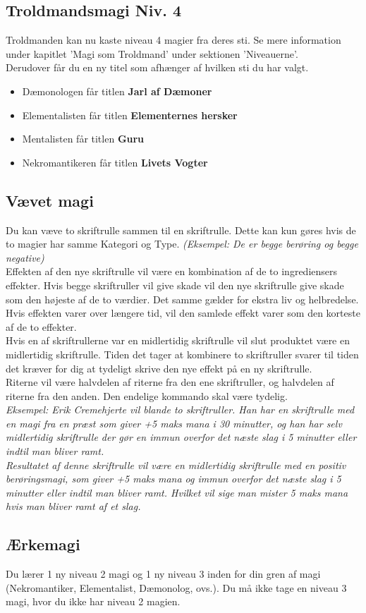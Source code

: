 \subsection{Troldmandsmagi Niv. 4}
Troldmanden kan nu kaste niveau 4 magier fra deres sti. Se mere information under kapitlet 'Magi som Troldmand' under sektionen 'Niveauerne'. \\
Derudover får du en ny titel som afhænger af hvilken sti du har valgt.\\
\begin{itemize}
    \item Dæmonologen får titlen \textbf{Jarl af Dæmoner}
    \item Elementalisten får titlen \textbf{Elementernes hersker}
    \item Mentalisten får titlen \textbf{Guru}
    \item Nekromantikeren får titlen \textbf{Livets Vogter}
\end{itemize}

\subsection{Vævet magi}
Du kan væve to skriftrulle sammen til en skriftrulle. Dette kan kun gøres hvis de to magier har samme Kategori og Type. \textit{(Eksempel: De er begge berøring og begge negative)}\\
Effekten af den nye skriftrulle vil være en kombination af de to ingrediensers effekter. Hvis begge skriftruller vil give skade vil den nye skriftrulle give skade som den højeste af de to værdier. Det samme gælder for ekstra liv og helbredelse. Hvis effekten varer over længere tid, vil den samlede effekt varer som den korteste af de to effekter.\\
Hvis en af skriftrullerne var en midlertidig skriftrulle vil slut produktet være en midlertidig skriftrulle.
Tiden det tager at kombinere to skriftruller svarer til tiden det kræver for dig at tydeligt skrive den nye effekt på en ny skriftrulle.\\
Riterne vil være halvdelen af riterne fra den ene skriftruller, og halvdelen af riterne fra den anden. Den endelige kommando skal være tydelig.\\
\textit{Eksempel: Erik Cremehjerte vil blande to skriftruller. Han har en skriftrulle med en magi fra en præst som giver +5 maks mana i 30 minutter, og han har selv midlertidig skriftrulle der gør en immun overfor det næste slag i 5 minutter eller indtil man bliver ramt.\\
Resultatet af denne skriftrulle vil være en midlertidig skriftrulle med en positiv berøringsmagi, som giver +5 maks mana og immun overfor det næste slag i 5 minutter eller indtil man bliver ramt. Hvilket vil sige man mister 5 maks mana hvis man bliver ramt af et slag.}

\subsection{Ærkemagi}
Du lærer 1 ny niveau 2 magi og 1 ny niveau 3 inden for din gren af magi (Nekromantiker, Elementalist, Dæmonolog, ovs.). Du må ikke tage en niveau 3 magi, hvor du ikke har niveau 2 magien.